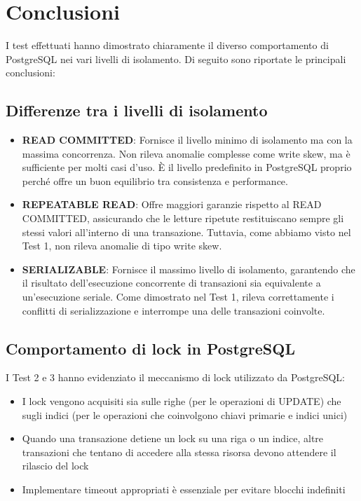\documentclass[a4paper,12pt]{report}
\begin{document}
\chapter{Conclusioni}

I test effettuati hanno dimostrato chiaramente il diverso comportamento di PostgreSQL nei vari livelli di isolamento. Di seguito sono riportate le principali conclusioni:

\section{Differenze tra i livelli di isolamento}

\begin{itemize}
    \item \textbf{READ COMMITTED}: Fornisce il livello minimo di isolamento ma con la massima concorrenza. Non rileva anomalie complesse come write skew, ma è sufficiente per molti casi d'uso. È il livello predefinito in PostgreSQL proprio perché offre un buon equilibrio tra consistenza e performance.

    \item \textbf{REPEATABLE READ}: Offre maggiori garanzie rispetto al READ COMMITTED, assicurando che le letture ripetute restituiscano sempre gli stessi valori all'interno di una transazione. Tuttavia, come abbiamo visto nel Test 1, non rileva anomalie di tipo write skew.

    \item \textbf{SERIALIZABLE}: Fornisce il massimo livello di isolamento, garantendo che il risultato dell'esecuzione concorrente di transazioni sia equivalente a un'esecuzione seriale. Come dimostrato nel Test 1, rileva correttamente i conflitti di serializzazione e interrompe una delle transazioni coinvolte.
\end{itemize}

\section{Comportamento di lock in PostgreSQL}

I Test 2 e 3 hanno evidenziato il meccanismo di lock utilizzato da PostgreSQL:

\begin{itemize}
    \item I lock vengono acquisiti sia sulle righe (per le operazioni di UPDATE) che sugli indici (per le operazioni che coinvolgono chiavi primarie e indici unici)
    \item Quando una transazione detiene un lock su una riga o un indice, altre transazioni che tentano di accedere alla stessa risorsa devono attendere il rilascio del lock
    \item Implementare timeout appropriati è essenziale per evitare blocchi indefiniti
\end{itemize}
\end{document}
